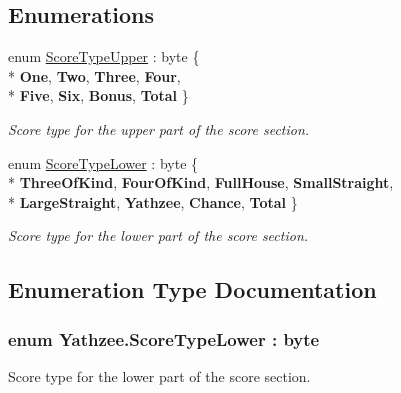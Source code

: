 \subsection*{Enumerations}
\begin{DoxyCompactItemize}
\item 
enum \hyperlink{namespace_yathzee_af9eae2784d7776b80bb77da141a63b7f}{Score\+Type\+Upper} \+: byte \{ \\*
{\bfseries One}, 
{\bfseries Two}, 
{\bfseries Three}, 
{\bfseries Four}, 
\\*
{\bfseries Five}, 
{\bfseries Six}, 
{\bfseries Bonus}, 
{\bfseries Total}
 \}\begin{DoxyCompactList}\small\item\em Score type for the upper part of the score section. \end{DoxyCompactList}
\item 
enum \hyperlink{namespace_yathzee_ae036ce06cdf75e284ea1cd78a457ef70}{Score\+Type\+Lower} \+: byte \{ \\*
{\bfseries Three\+Of\+Kind}, 
{\bfseries Four\+Of\+Kind}, 
{\bfseries Full\+House}, 
{\bfseries Small\+Straight}, 
\\*
{\bfseries Large\+Straight}, 
{\bfseries Yathzee}, 
{\bfseries Chance}, 
{\bfseries Total}
 \}\begin{DoxyCompactList}\small\item\em Score type for the lower part of the score section. \end{DoxyCompactList}
\end{DoxyCompactItemize}


\subsection{Enumeration Type Documentation}
\subsubsection[{\texorpdfstring{Score\+Type\+Lower}{ScoreTypeLower}}]{\setlength{\rightskip}{0pt plus 5cm}enum {\bf Yathzee.\+Score\+Type\+Lower} \+: byte\hspace{0.3cm}{\ttfamily [strong]}}\hypertarget{namespace_yathzee_ae036ce06cdf75e284ea1cd78a457ef70}{}\label{namespace_yathzee_ae036ce06cdf75e284ea1cd78a457ef70}


Score type for the lower part of the score section. 

